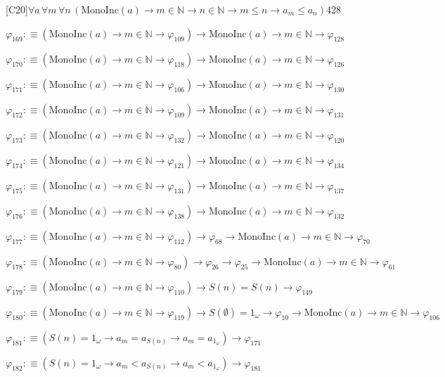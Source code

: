 \begin{fullproof}{[C20]}{$\forall a\,\forall m\,\forall n\,(\mathrm{MonoInc}(a) \to m \in \mathbb{N} \to n \in \mathbb{N} \to m \leq n \to a_{m} \leq a_{n})$}{428}
\begin{abbrevlist}
\item $\varphi_{169} :\equiv (\mathrm{MonoInc}(a) \to m \in \mathbb{N} \to \varphi_{109}) \to \mathrm{MonoInc}(a) \to m \in \mathbb{N} \to \varphi_{128}$
\item $\varphi_{170} :\equiv (\mathrm{MonoInc}(a) \to m \in \mathbb{N} \to \varphi_{118}) \to \mathrm{MonoInc}(a) \to m \in \mathbb{N} \to \varphi_{126}$
\item $\varphi_{171} :\equiv (\mathrm{MonoInc}(a) \to m \in \mathbb{N} \to \varphi_{106}) \to \mathrm{MonoInc}(a) \to m \in \mathbb{N} \to \varphi_{130}$
\item $\varphi_{172} :\equiv (\mathrm{MonoInc}(a) \to m \in \mathbb{N} \to \varphi_{109}) \to \mathrm{MonoInc}(a) \to m \in \mathbb{N} \to \varphi_{131}$
\item $\varphi_{173} :\equiv (\mathrm{MonoInc}(a) \to m \in \mathbb{N} \to \varphi_{132}) \to \mathrm{MonoInc}(a) \to m \in \mathbb{N} \to \varphi_{120}$
\item $\varphi_{174} :\equiv (\mathrm{MonoInc}(a) \to m \in \mathbb{N} \to \varphi_{121}) \to \mathrm{MonoInc}(a) \to m \in \mathbb{N} \to \varphi_{134}$
\item $\varphi_{175} :\equiv (\mathrm{MonoInc}(a) \to m \in \mathbb{N} \to \varphi_{131}) \to \mathrm{MonoInc}(a) \to m \in \mathbb{N} \to \varphi_{137}$
\item $\varphi_{176} :\equiv (\mathrm{MonoInc}(a) \to m \in \mathbb{N} \to \varphi_{138}) \to \mathrm{MonoInc}(a) \to m \in \mathbb{N} \to \varphi_{132}$
\item $\varphi_{177} :\equiv (\mathrm{MonoInc}(a) \to m \in \mathbb{N} \to \varphi_{112}) \to \varphi_{68} \to \mathrm{MonoInc}(a) \to m \in \mathbb{N} \to \varphi_{70}$
\item $\varphi_{178} :\equiv (\mathrm{MonoInc}(a) \to m \in \mathbb{N} \to \varphi_{80}) \to \varphi_{26} \to \varphi_{25} \to \mathrm{MonoInc}(a) \to m \in \mathbb{N} \to \varphi_{61}$
\item $\varphi_{179} :\equiv (\mathrm{MonoInc}(a) \to m \in \mathbb{N} \to \varphi_{110}) \to S(n) = S(n) \to \varphi_{149}$
\item $\varphi_{180} :\equiv (\mathrm{MonoInc}(a) \to m \in \mathbb{N} \to \varphi_{119}) \to S(\emptyset) = 1_{\omega} \to \varphi_{10} \to \mathrm{MonoInc}(a) \to m \in \mathbb{N} \to \varphi_{106}$
\item $\varphi_{181} :\equiv (S(n) = 1_{\omega} \to a_{m} = a_{S(n)} \to a_{m} = a_{1_{\omega}}) \to \varphi_{171}$
\item $\varphi_{182} :\equiv (S(n) = 1_{\omega} \to a_{m} < a_{S(n)} \to a_{m} < a_{1_{\omega}}) \to \varphi_{181}$

\end{abbrevlist}
\end{fullproof}
